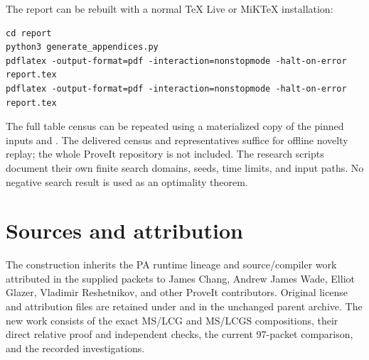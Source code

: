\documentclass[11pt]{article}
\begin{document}
The report can be rebuilt with a normal TeX Live or MiKTeX installation:
\begin{verbatim}
cd report
python3 generate_appendices.py
pdflatex -output-format=pdf -interaction=nonstopmode -halt-on-error report.tex
pdflatex -output-format=pdf -interaction=nonstopmode -halt-on-error report.tex
\end{verbatim}
The full table census can be repeated using a materialized copy of the
pinned inputs and . The delivered
census and representatives suffice for offline novelty replay; the whole
ProveIt repository is not included. The research scripts document their
own finite search domains, seeds, time limits, and input paths. No
negative search result is used as an optimality theorem.

\section{Sources and attribution}
The construction inherits the PA runtime lineage and source/compiler work
attributed in the supplied packets to James Chang, Andrew James Wade,
Elliot Glazer, Vladimir Reshetnikov, and other ProveIt contributors. Original
license and attribution files are retained under  and in
the unchanged parent archive. The new work consists of the exact MS/LCG
and MS/LCGS compositions, their direct relative proof and independent
checks, the current 97-packet comparison, and the recorded investigations.
\end{document}
